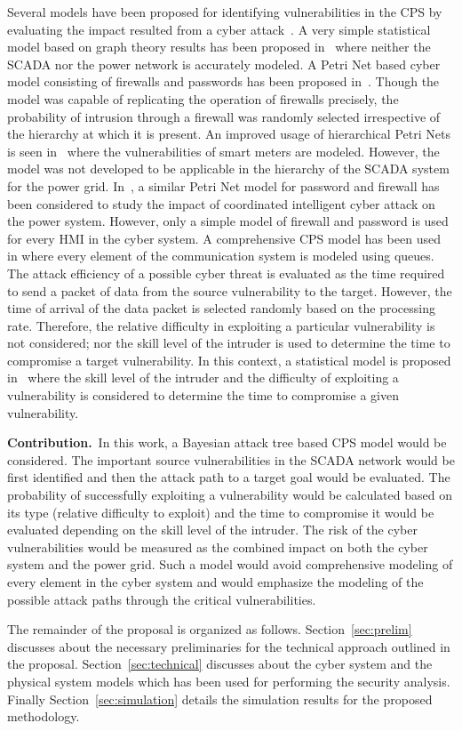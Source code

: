 Several models have been proposed for identifying vulnerabilities in the CPS by evaluating the impact resulted from a cyber attack~\cite{stanley_2018,maninmiddle,petrinet1,petrinet2,Sridhar2012,alex1,alex2,alex3}. A very simple statistical model based on graph theory results has been proposed in~\cite{stanley_2018} where neither the SCADA nor the power network is accurately modeled. A Petri Net based cyber model consisting of firewalls and passwords has been proposed in~\cite{petrinet1}. Though the model was capable of replicating the operation of firewalls precisely, the probability of intrusion through a firewall was randomly selected irrespective of the hierarchy at which it is present. An improved usage of hierarchical Petri Nets is seen in~\cite{petrinet2} where the vulnerabilities of smart meters are modeled. However, the model was not developed to be applicable in the hierarchy of the SCADA system for the power grid. In~\cite{Sridhar2012}, a similar Petri Net model for password and firewall has been considered to study the impact of coordinated intelligent cyber attack on the power system. However, only a simple model of firewall and password is used for every HMI in the cyber system. A comprehensive CPS model has been used in \cite{alex1,alex2,alex3} where every element of the communication system is modeled using queues. The attack efficiency of a possible cyber threat is evaluated as the time required to send a packet of data from the source vulnerability to the target. However, the time of arrival of the data packet is selected randomly based on the processing rate. Therefore, the relative difficulty in exploiting a particular vulnerability is not considered; nor the skill level of the intruder is used to determine the time to compromise a target vulnerability. In this context, a statistical model is proposed in~\cite{mcqueen} where the skill level of the intruder and the difficulty of exploiting a vulnerability is considered to determine the time to compromise a given vulnerability.

\textbf{Contribution.}\ In this work, a Bayesian attack tree based CPS model would be considered. The important source vulnerabilities in the SCADA network would be first identified and then the attack path to a target goal would be evaluated. The probability of successfully exploiting a vulnerability would be calculated based on its type (relative difficulty to exploit) and the time to compromise it would be evaluated depending on the skill level of the intruder. The risk of the cyber vulnerabilities would be measured as the combined impact on both the cyber system and the power grid. Such a model would avoid comprehensive modeling of every element in the cyber system and would emphasize the modeling of the possible attack paths through the critical vulnerabilities.

The remainder of the proposal is organized as follows. Section~\ref{sec:prelim} discusses about the necessary preliminaries for the technical approach outlined in the proposal. Section~\ref{sec:technical} discusses about the cyber system and the physical system models which has been used for performing the security analysis. Finally Section~\ref{sec:simulation} details the simulation results for the proposed methodology.
